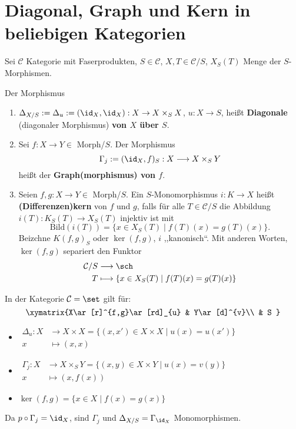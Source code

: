 \section{Diagonal, Graph und Kern in beliebigen Kategorien}

Sei $\mathcal{C}$ Kategorie mit Faserprodukten, $S\in\mathcal{C}$,
$X,T\in\mathcal{C}/S$, $X_{S}(T)$ Menge der $S$-Morphismen.
\begin{defn}[24]
  Der Morphismus
  \begin{enumerate}
  \item $\Delta_{X/S}:=\Delta_{u}:=(\id_{X},\id_{X}):X\rightarrow X\times_{S}X$,
    $u:X\rightarrow S$, heißt \textbf{Diagonale }(diagonaler Morphismus)
    \textbf{von $X$ über $S$}.
  \item Sei $f:X\rightarrow Y\in$ Morph/$S$. Der Morphismus
    \[
      \Gamma_{j}:=(\id_{X},f)_{S}:X\longrightarrow X\times_{S}Y
    \]
    heißt der \textbf{Graph(morphismus) von $f$}.
  \item Seien $f,g:X\rightarrow Y\in$ Morph/$S$. Ein $S$-Monomorphismus
    $i:K\rightarrow X$ heißt \textbf{(Differenzen)kern} von $f$ und
    $g$, falls für alle $T\in\mathcal{C}/S$ die Abbildung $i(T):K_{S}(T)\rightarrow X_{S}(T)$
    injektiv ist mit
    \[
      \text{Bild}(i(T))=\{x\in X_{S}(T)\mid f(T)(x)=g(T)(x)\}.
    \]
    Beizchne $K(f,g)_{S}$ oder $\ker(f,g)$, $i$ ,,kanonisch``. Mit
    anderen Worten, $\ker(f,g)$ separiert den Funktor
    \begin{align*}
      \mathcal{C}/S & \longrightarrow\sch\\
      T & \longmapsto\{x\in X_{S}(T)\mid f(T)(x)=g(T)(x)\}
    \end{align*}
  \end{enumerate}
\end{defn}

\begin{example}[25]
  In der Kategorie $\mathcal{C}=\set$ gilt für:
  \[
    \xymatrix{X\ar[r]^{f,g}\ar[rd]_{u} & Y\ar[d]^{v}\\
      & S
    }
  \]
  \begin{itemize}
  \item[]
    $\begin{array}{rl}
       \Delta_{u}:X & \longrightarrow X\times X=\{(x,x')\in X\times X\mid u(x)=u(x')\}\\
       x & \longmapsto(x,x)
     \end{array}$
   \item[]
     $\begin{array}{rl}
        \Gamma_{j}:X & \longrightarrow X\times_{S}Y=\{(x,y)\in X\times Y\mid u(x)=v(y)\}\\
        x & \longmapsto(x,f(x))
      \end{array}$
    \item[]
      $\ker(f,g)=\{x\in X\mid f(x)=g(x)\}$
    \end{itemize}
    Da $p\circ\Gamma_{j}=\id_{X}$, sind $\Gamma_{j}$ und $\Delta_{X/S}=\Gamma_{\id_{X}}$
    Monomorphismen.
\end{example}

